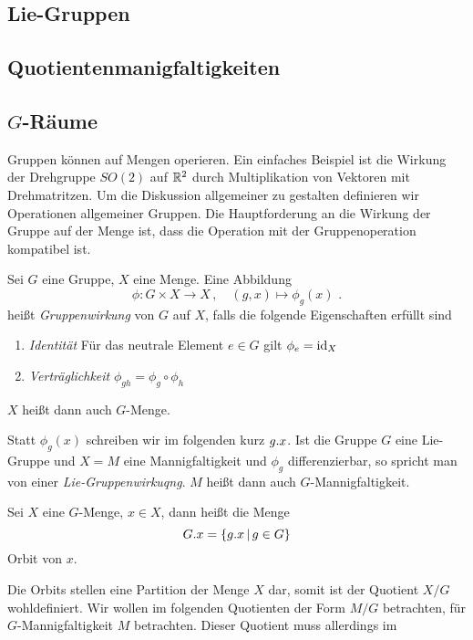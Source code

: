 \subsection{Lie-Gruppen}
\subsection{Quotientenmanigfaltigkeiten}
\subsection[G-Räume]{$G$-Räume}
Gruppen können auf Mengen operieren. Ein einfaches Beispiel ist die Wirkung
der Drehgruppe $SO(2)$ auf $\mathbb{R}^2$ durch Multiplikation von
Vektoren mit Drehmatritzen. Um die Diskussion allgemeiner zu gestalten definieren wir
Operationen allgemeiner Gruppen. Die Hauptforderung an die Wirkung der Gruppe
auf der Menge ist, dass die Operation mit der Gruppenoperation kompatibel ist.
 \begin{definition}[Gruppenwirkung]
Sei $G$ eine Gruppe, $X$ eine Menge. Eine Abbildung
\begin{equation}
\phi:G\times X\to X\,,\quad (g,x)\mapsto\phi_g(x)\,\,.
\end{equation}
heißt \emph{Gruppenwirkung} von $G$ auf $X$, falls die folgende Eigenschaften
erfüllt sind
\begin{enumerate}
  \item \emph{Identität} Für das neutrale Element $e\in G$ gilt
  $\displaystyle\phi_e=\operatorname{id}_X$
  \item \emph{Verträglichkeit} $\displaystyle\phi_{gh}=\phi_g\circ\phi_h$
\end{enumerate}
$X$ heißt dann auch $G$-Menge.
\end{definition}
Statt $\phi_g(x)$ schreiben wir im folgenden kurz $g. x$.
Ist die Gruppe $G$ eine Lie-Gruppe und $X=M$ eine Mannigfaltigkeit und $\phi_g$
 differenzierbar, so spricht man von einer \emph{Lie-Gruppenwirkuqng}. $M$ heißt dann auch $G$-Mannigfaltigkeit.
\begin{definition}[Orbit]
Sei $X$ eine $G$-Menge, $x\in X$, dann heißt die Menge
\begin{equation}
G . x=\{g . x\,|\,g\in G\}
\end{equation}
Orbit von $x$.
\end{definition}
Die Orbits stellen eine Partition der Menge $X$ dar, somit ist der Quotient 
$X/G$ wohldefiniert.
Wir wollen im folgenden Quotienten der Form $M/G$ betrachten, für
$G$-Mannigfaltigkeit $M$ betrachten. Dieser Quotient muss allerdings im
